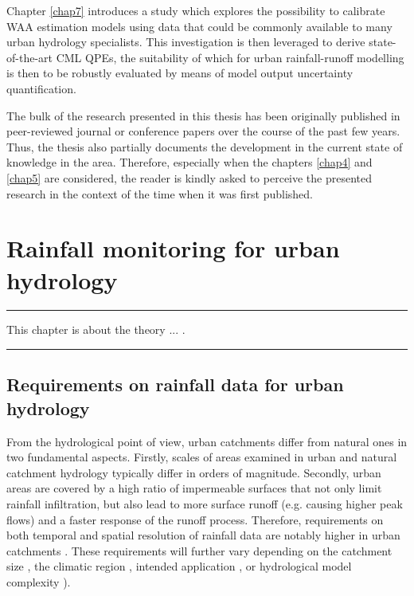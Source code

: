 \documentclass{ctuthesis}\usepackage[]{graphicx}\usepackage[]{color}
\begin{document}
Chapter \ref{chap7} introduces a study which explores the possibility to calibrate WAA estimation models using data that could be commonly available to many urban hydrology specialists. This investigation is then leveraged to derive state-of-the-art CML QPEs, the suitability of which for urban rainfall-runoff modelling is then to be robustly evaluated by means of model output uncertainty quantification.

The bulk of the research presented in this thesis has been originally published in peer-reviewed journal or conference papers over the course of the past few years. Thus, the thesis also partially documents the development in the current state of knowledge in the area. Therefore, especially when the chapters \ref{chap4} and \ref{chap5} are considered, the reader is kindly asked to perceive the presented research in the context of the time when it was first published.



        


\chapter{Rainfall monitoring for urban hydrology} \label{chap2}

\rule{\textwidth}{0.4pt}
This chapter is about the theory ... . \newline
\rule[0.2cm]{\textwidth}{0.4pt}

\section{Requirements on rainfall data for urban hydrology}

From the hydrological point of view, urban catchments differ from natural ones in two fundamental aspects. Firstly, scales of areas examined in urban and natural catchment hydrology typically differ in orders of magnitude. Secondly, urban areas are covered by a high ratio of impermeable surfaces that not only limit rainfall infiltration, but also lead to more surface runoff (e.g. causing higher peak flows) and a faster response of the runoff process. Therefore, requirements on both temporal and spatial resolution of rainfall data are notably higher in urban catchments \citep[e.g.][]{schilling1991rainfall, berneTemporalSpatialResolution2004}. These requirements will further vary depending on the catchment size \citep{ochoa-rodriguezImpactSpatialTemporal2015}, the climatic region \citep{berneTemporalSpatialResolution2004}, intended application \citep[e.g. long-term analysis vs. online nowcasting][]{einfaltRoadmapUseRadar2004}, or hydrological model complexity \citep[semi- vs. fully-distributed][]{giresImpactsSmallScale2015}). 
\end{document}
